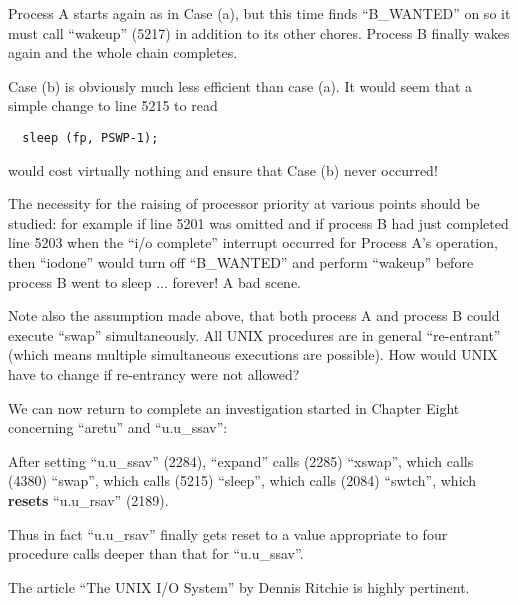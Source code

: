 Process A starts again as in Case (a),
but this time finds ``B\_WANTED'' on so it
must call ``wakeup'' (5217) in addition
to its other chores. Process B finally
wakes again and the whole chain completes.
\ed

Case (b) is obviously much less efficient than case (a). It would seem that
a simple change to line 5215 to read

\begin{verbatim}
  sleep (fp, PSWP-1);
\end{verbatim}

\noindent would cost virtually nothing and ensure
that Case (b) never occurred!

The necessity for the raising of processor priority at various points
should be studied: for example if line
5201 was omitted and if process B had
just completed line 5203 when the ``i/o
complete'' interrupt occurred for Process A's operation, then ``iodone'' would
turn off ``B\_WANTED'' and perform
``wakeup'' before process B went to sleep ... forever! A bad scene.


Note also the assumption made above,
that both process A and process B could
execute ``swap'' simultaneously. All UNIX
procedures are in general ``re-entrant''
(which means multiple simultaneous executions are possible). How would UNIX
have to change if re-entrancy were not
allowed?


We can now return to complete an investigation started
in Chapter Eight concerning ``aretu'' and ``u.u\_ssav'':

After setting ``u.u\_ssav'' (2284),
``expand'' calls (2285) ``xswap'',
which calls (4380) ``swap'',
which calls (5215) ``sleep'',
which calls (2084) ``swtch'',
which {\bf resets} ``u.u\_rsav'' (2189).

Thus in fact ``u.u\_rsav'' finally gets
reset to a value appropriate to four
procedure calls deeper than that for
``u.u\_ssav''.


The article ``The UNIX I/O System'' by
Dennis Ritchie is highly pertinent.
